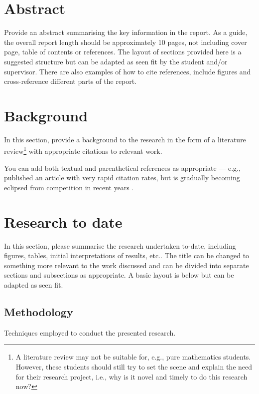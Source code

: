 \documentclass[11pt]{report}
\begin{document}
\chapter*{Abstract}

Provide an abstract summarising the key information in the report.  As a guide, the overall report length should be approximately 10 pages, not including cover page, table of contents or references.  The layout of sections provided here is a suggested structure but can be adapted as seen fit by the student and/or supervisor.  There are also examples of how to cite references, include figures and cross-reference different parts of the report.

\chapter{Background}
In this section, provide a background to the research in the form of a literature review\footnote{A literature review may not be suitable for, e.g., pure mathematics students. However, these students should still try to set the scene and explain the need for their research project, i.e., why is it novel and timely to do this research now?} with appropriate citations to relevant work.

You can add both textual and parenthetical references as appropriate --- e.g., \citet{2012PhLB..716....1A} published an article with very rapid citation rates, but is gradually becoming eclipsed from competition in recent years \citep[e.g.,][to name but a few]{2018Natur.556...43C, 2018PhRvD..98c0001T, 2019ApJ...873..111I}.

\chapter{Research to date}
In this section, please summarise the research undertaken to-date, including figures, tables, initial interpretations of results, etc..  The title can be changed to something more relevant to the work discussed and can be divided into separate sections and subsections as appropriate.  A basic layout is below but can be adapted as seen fit.

\section{Methodology}

Techniques employed to conduct the presented research.
\end{document}
